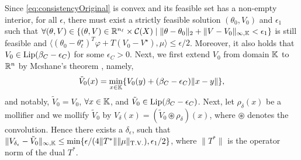 \begin{pf}
    
    Since \eqref{eq:consistencyOriginal} is convex and its feasible set has a non-empty interior, for all $\epsilon$, there must exist a strictly feasible solution $(\theta_0,V_0)$ and $\epsilon_1$ such that $\forall (\theta,V)\in \{(\theta,V)\in\mathbb{R}^{n_\ell}\times \mathcal{C}(X)\;|\; \|\theta - \theta_0\|_2+\|V-V_0\|_{\infty,\mathbb{K}}< \epsilon_1\}$ is still feasible
    and $\langle (\theta_0 - \theta_\ell^\star)^T\varphi + T(V_0-V^\star), \mu \rangle \leq \epsilon/2$.
    Moreover, it also holds that $V_0\in\operatorname*{Lip}(\beta_C-\epsilon_C)$ for some $\epsilon_C>0$.
    Next, we first extend $V_0$ from domain $\mathbb{K}$ to $\mathbb{R}^n$ by Mcshane's theorem \citep{mcshane1934extension}, namely,
    \begin{align*}
    \tilde{V}_0(x) = \min_{x\in\mathbb{K}} \{V_0(y)+(\beta_C-\epsilon_C)\|x-y\|\},
    \end{align*}
    and notably, $\tilde{V}_0=V_0$, $\forall x\in\mathbb{K}$, and $\tilde{V}_0\in\operatorname*{Lip}(\beta_C-\epsilon_C)$.
    Next, let $\rho_\delta(x)$ be a mollifier and we mollify $\tilde{V}_0$ by $V_\delta(x) = (\tilde V_0\circledast \rho_\delta)(x)$, where $\circledast$ denotes the convolution.
    Hence 
    there exists a $\delta_\epsilon$, such that $\|V_{\delta_\epsilon}-\tilde V_0\|_{\infty,\mathbb{K}}\le\min\{\epsilon/(4\|T^*\|\|\mu\|_{\operatorname*{T.V.}}),\epsilon_1/2\}$, where $\|T^*\|$ is the operator norm of the dual $T^*$.
    

\end{pf}
